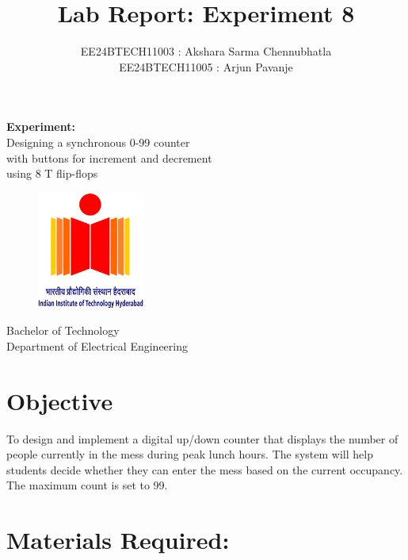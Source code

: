 \documentclass{article}
\title{\textbf{Lab Report: Experiment 8}}
\author{EE24BTECH11003 : Akshara Sarma Chennubhatla\\EE24BTECH11005 : Arjun Pavanje}
\begin{document}
\maketitle
\begin{center}
	\textbf{Experiment:}\\Designing a synchronous 0-99 counter\\with buttons for increment and decrement\\using 8 T flip-flops
\end{center}
\vspace{30pt}
\begin{figure}[h!]
	\centering
	\includegraphics[width = 100pt]{.logo/logo.png}\\
\end{figure}
\begin{center}
	Bachelor of Technology\\
	\vspace{10pt}
	Department of Electrical Engineering\\
\end{center}
\newpage

\section{Objective}
To design and implement a digital up/down counter that displays the number of people currently in the mess during peak lunch hours. The system will help students decide whether they can enter the mess based on the current occupancy. The maximum count is set to 99.
\section{Materials Required:}
\end{document}
